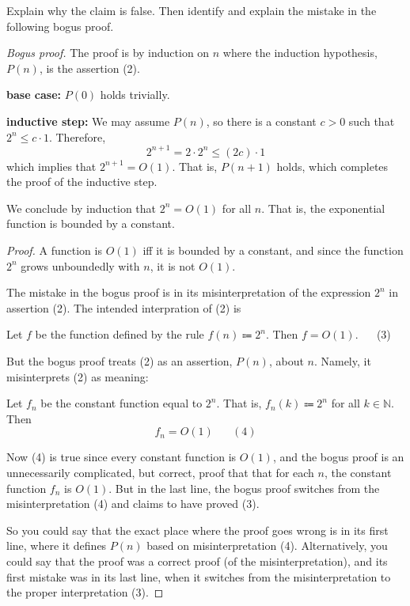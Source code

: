 \documentclass[14pt]{extarticle}
\begin{document}
Explain why the claim is false. Then identify and explain the mistake in the following bogus proof.

{\it Bogus proof.} The proof is by induction on $n$ where the induction hypothesis, $P(n)$, is the assertion (2).

{\bf base case:} $P(0)$ holds trivially.

{\bf inductive step:} We may assume $P(n)$, so there is a constant $c > 0$ such that $2^n \leq c \cdot 1$. Therefore,
$$
2^{n+1} = 2 \cdot 2^n \leq (2c) \cdot 1
$$
which implies that $2^{n+1} = O(1)$. That is, $P(n + 1)$ holds, which completes the proof of the inductive step. 

We conclude by induction that $2^{n} = O(1)$ for all $n$. That is, the exponential function is bounded by a constant.

\begin{proof}
A function is $O(1)$ iff it is bounded by a constant, and since the function $2^n$ grows unboundedly with $n$, it is not $O(1)$.

The mistake in the bogus proof is in its misinterpretation of the expression $2^n$ in assertion (2). The intended interpration of (2) is

\begin{center}
Let $f$ be the function defined by the rule $f(n) \Coloneqq 2^n$. Then $f = O(1)$. \,\,\,\,\,\,\,\,(3)
\end{center}

But the bogus proof treats (2) as an assertion, $P(n)$, about $n$. Namely, it misinterprets (2) as mean­ing:
\begin{center}
Let $f_n$ be the constant function equal to $2^n$. That is, $f_n(k) \Coloneqq 2^n$ for all $k \in \mathbb{N}$. Then 
$$
f_n = O(1)\,\,\,\,\,\,\,\,\,\,(4)
$$
\end{center}

Now (4) is true since every constant function is $O(1)$, and the bogus proof is an unnecessarily complicated, but correct, proof that that for each $n$, the constant function $f_n$ is $O(1)$. But in the last line, the bogus proof switches from the misinterpretation (4) and claims to have proved (3).

So you could say that the exact place where the proof goes wrong is in its first line, where it defines $P(n)$ based on misinterpretation (4). Alternatively, you could say that the proof was a correct proof (of the misinterpretation), and its first mistake was in its last line, when it switches from the misinterpretation to the proper interpretation (3).
\end{proof}
\end{document}
